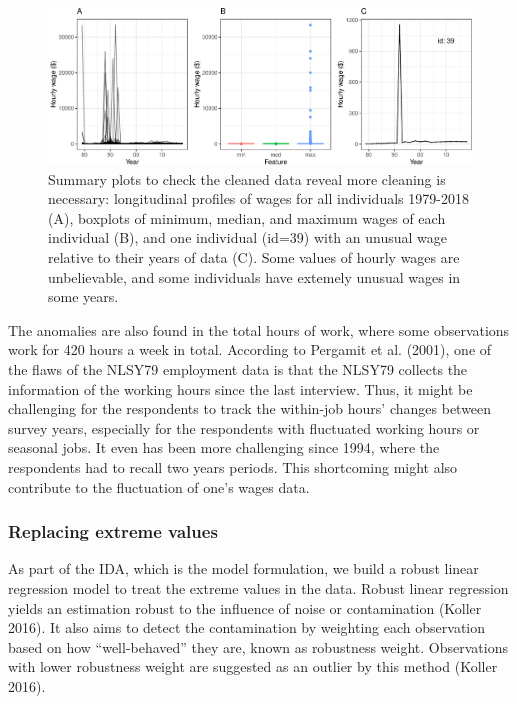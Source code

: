 \documentclass[12pt]{article}
\begin{document}
\begin{figure}

{\centering \includegraphics[width=1\linewidth]{figures/feature-plot-1} 

}

\caption{Summary plots to check the cleaned data reveal more cleaning is necessary: longitudinal profiles of wages for all individuals 1979-2018 (A), boxplots of minimum, median, and maximum wages of each individual (B), and one individual (id=39) with an unusual wage relative to their years of data (C). Some values of hourly wages are unbelievable, and some individuals have extemely unusual wages in some years.}\label{fig:feature-plot}
\end{figure}

The anomalies are also found in the total hours of work, where some observations work for 420 hours a week in total. According to Pergamit et al. (2001), one of the flaws of the NLSY79 employment data is that the NLSY79 collects the information of the working hours since the last interview. Thus, it might be challenging for the respondents to track the within-job hours' changes between survey years, especially for the respondents with fluctuated working hours or seasonal jobs. It even has been more challenging since 1994, where the respondents had to recall two years periods. This shortcoming might also contribute to the fluctuation of one's wages data.

\hypertarget{replacing-extreme-values}{%
\subsubsection{Replacing extreme values}\label{replacing-extreme-values}}

As part of the IDA, which is the model formulation, we build a robust linear regression model to treat the extreme values in the data. Robust linear regression yields an estimation robust to the influence of noise or contamination (Koller 2016). It also aims to detect the contamination by weighting each observation based on how ``well-behaved'' they are, known as robustness weight. Observations with lower robustness weight are suggested as an outlier by this method (Koller 2016).
\end{document}
